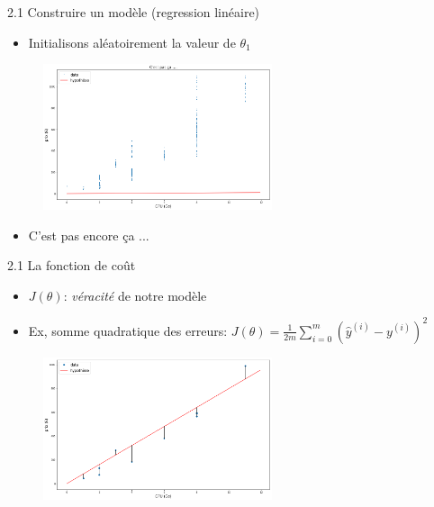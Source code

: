 \begin{frame}{2.1 Construire un modèle (regression linéaire)}
  \begin{itemize}
  \item Initialisons aléatoirement la valeur de $\theta_{1}$
  \end{itemize}
  \vspace{-0.5cm}
  \begin{figure}
    \includegraphics[width=0.6\textwidth]{figs/model.png}
  \end{figure}
  \vspace{-0.5cm}
  \begin{itemize}
  \item C'est pas encore ça ...
  \end{itemize}
\end{frame}

\begin{frame}{2.1 La fonction de coût}
  \begin{itemize}
  \item  $J(\theta)$: \textit{véracité} de notre modèle
  \item Ex, somme quadratique des erreurs: $J(\theta) = \frac{1}{2m} \displaystyle\sum_{i=0}^{m}(\hat{y}^{(i)} - y^{(i)})^{2}$
  \end{itemize}
  \begin{figure}
    \includegraphics[width=0.6\textwidth]{figs/modelEstimation.png}
  \end{figure}  
\end{frame}

